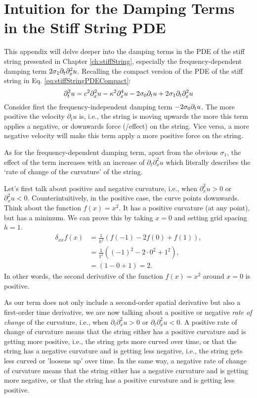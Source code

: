 \chapter{Intuition for the Damping Terms in the Stiff String PDE}\label{app:intuitionSigma1}
This appendix will delve deeper into the damping terms in the PDE of the stiff string presented in Chapter \ref{ch:stiffString}, especially the frequency-dependent damping term $2\sigma_1\partial_t\partial_x^2 u$. Recalling the compact version of the PDE of the stiff string in Eq. \eqref{eq:stiffStringPDECompact}:
\begin{equation}
    \partial_t^2 u = c^2 \partial_x^2 u - \kappa^2 \partial_x^4 u - 2 \sigma_{0} \partial_t u + 2 \sigma_{1} \partial_t \partial_x^2 u
\end{equation}
Consider first the frequency-independent damping term $-2\sigma_{0}\partial_t u$. The more positive the velocity $\partial_tu$ is, i.e., the string is moving upwards the more this term applies a negative, or downwards force (/effect) on the string. Vice versa, a more negative velocity will make this term apply a more positive force on the string. 

As for the frequency-dependent damping term, apart from the obvious $\sigma_1$, the effect of the term increases with an increase of $\partial_t\partial_x^2u$ which literally describes the `rate of change of the curvature' of the string.

Let's first talk about positive and negative curvature, i.e., when $\partial_x^2u > 0$ or $\partial_x^2u < 0$. Counterintuitively, in the positive case, the curve points downwards. Think about the function $f(x) = x^2$. It has a positive curvature (at any point), but has a minimum. We can prove this by taking $x=0$ and setting grid spacing $h=1$.
\begin{equation}
  \begin{aligned}
  \delta_{xx}f(x) &= \frac{1}{h^2} \left(f(-1)-2f(0)+f(1)\right), \\
  &= \frac{1}{1^2} \left((-1)^2-2\cdot0^2+1^2\right),\\
  &= \left(1-0+1\right) = 2.
  \end{aligned}
\end{equation}
In other words, the second derivative of the function $f(x)=x^2$ around $x=0$ is positive.

As our term does not only include a second-order spatial derivative but also a first-order time derivative, we are now talking about a positive or negative \textit{rate of change} of the curvature, i.e., when $\partial_t\partial_x^2u>0$ or $\partial_t\partial_x^2u<0$. A positive rate of change of curvature means that the string either has a positive curvature and is getting more positive, i.e., the string gets more curved over time, or that the string has a negative curvature and is getting less negative, i.e., the string gets less curved or 'loosens up' over time.  In the same way, a negative rate of change of curvature means that the string either has a negative curvature and is getting more negative, or that the string has a positive curvature and is getting less positive. 

